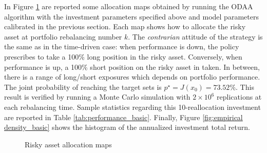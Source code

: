 In Figure \ref{fig:basic_maps} are reported some allocation maps obtained by running the \gls{ODAA} algorithm with the investment parameters specified above and model parameters calibrated in the previous section. Each map shows how to allocate the risky asset at portfolio rebalancing number $k$. The \textit{contrarian} attitude of the strategy is the same as in the time-driven case: when performance is down, the policy prescribes to take a 100\% long position in the risky asset. Conversely, when performance is up, a 100\% short position on the risky asset in taken. In between, there is a range of long/short exposures which depends on portfolio performance. The joint probability of reaching the target sets is $p^{\star} = J(x_0) = 73.52\%$. This result is verified by running a Monte Carlo simulation with $2\times10^6$ replications at each rebalancing time. Sample statistics regarding this 10-reallocation investment are reported in Table \ref{tab:performance_basic}. Finally, Figure \ref{fig:empirical density_basic} shows the histogram of the annualized investment  total return.
\begin{figure}[]
	\caption{Risky asset allocation maps}
	\label{fig:basic_maps}
\end{figure}

